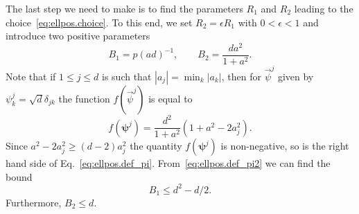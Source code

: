 The last step we need to make is to find the parameters $R_{1}$ and $R_{2}$ leading to the choice~\eqref{eq:ellpos.choice}.
To this end, we set $R_{2}=\epsilon R_{1}$ with $0<\epsilon<1$ and introduce two positive parameters
\begin{equation}
  B_{1}=p{(a d)}^{-1},\qquad B_{2}=\frac{d a^2}{1+a^2}.
\end{equation}
Note that if $1\leq j\leq d$ is such that $|a_j|=\min_k |a_k|$, then for $\vec\psi^j$ given by $\psi^j_k=\sqrt{d} \delta_{jk}$ the function $f(\vec\psi^j)$ is equal to
\begin{equation}
f\left(\boldsymbol{\psi}^{j}\right)=\frac{d^{2}}{1+a^{2}}\left(1+a^{2}-2a_{j}^{2}\right).
\end{equation}
Since $a^2-2a_j^2\geq(d-2)a_j^2$ the quantity $f(\boldsymbol{\psi}^{j})$ is non-negative, so is the right hand side of Eq.~\eqref{eq:ellpos.def_pi}.
From~\eqref{eq:ellpos.def_pi2} we can find the bound
\begin{equation}
  \label{eq:ellpos.b1_bound}
  B_{1} \le d^{2}-d/2.
\end{equation}
Furthermore, $B_{2} \le d$.

